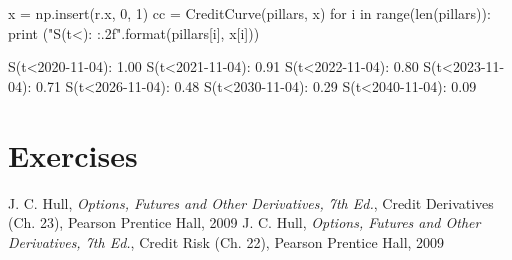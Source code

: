 \begin{ipython}
x = np.insert(r.x, 0, 1)
cc = CreditCurve(pillars, x)
for i in range(len(pillars)):
    print ("S(t<{}): {:.2f}".format(pillars[i], x[i]))
\end{ipython}
\begin{ioutput}
S(t<2020-11-04): 1.00
S(t<2021-11-04): 0.91
S(t<2022-11-04): 0.80
S(t<2023-11-04): 0.71
S(t<2026-11-04): 0.48
S(t<2030-11-04): 0.29
S(t<2040-11-04): 0.09
\end{ioutput}

\section*{Exercises}


\begin{thebibliography}{9}
 J. C. Hull, \emph{Options, Futures and Other Derivatives, 7th Ed.}, Credit Derivatives (Ch. 23), Pearson Prentice Hall, 2009
 J. C. Hull, \emph{Options, Futures and Other Derivatives, 7th Ed.}, Credit Risk (Ch. 22), Pearson Prentice Hall, 2009
\end{thebibliography}
